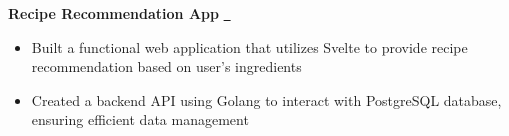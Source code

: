 \textbf{Recipe Recommendation App} \href{https://gitfront.io/r/ininicho/wUe3smDfVoLD/FindMyRecipe/}{\github\ } \par
\begin{itemize}
	\item Built a functional web application that utilizes Svelte to provide recipe recommendation based on user's ingredients
  \item Created a backend API using Golang to interact with PostgreSQL database, ensuring efficient data management
\end{itemize}
\vspace{0.1cm} \par
